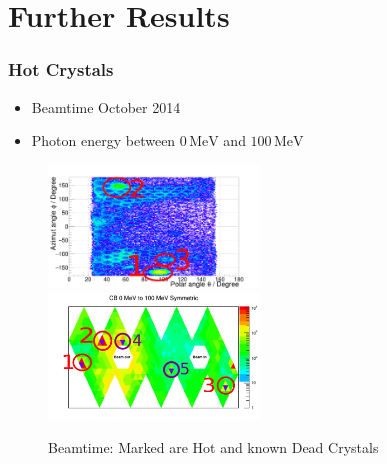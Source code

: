 \documentclass[slidestop,compress,mathserif]{beamer}
\begin{document}
\section{Further Results}
\begin{frame}
	\frametitle{Hot Crystals}
	\begin{itemize}
		\item Beamtime October 2014
		\item Photon energy between $0\,\text{MeV}$ and $100\,\text{MeV}$
	\end{itemize}
	\begin{figure}
		\includegraphics[width=0.50\textwidth]{Pictures/20172104StrahlzeitClusterSize0Marker}
		\includegraphics[width=0.50\textwidth]{Pictures/20172104StrahlzeitClusterSize0MarkerMap}
		\caption{Beamtime: Marked are Hot and known Dead Crystals }
	\end{figure}
	\begin{table}
	\end{table}
\end{frame}
\end{document}
